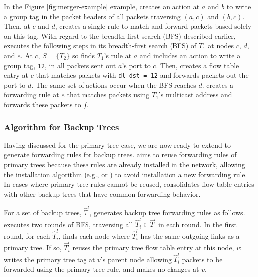 In the Figure \ref{fig:merger-example} example, \merge  creates an action at $a$ and $b$ to write a group tag in the packet headers of all packets traversing $(a,c)$ and $(b,c)$.
Then, at $c$ and $d$, \merge creates a single rule to match and forward packets based solely on this tag.  With regard to the breadth-first search (BFS) described earlier, 
\merge executes the following steps in  its breadth-first search (BFS) of $T_1$ at nodes $c$, $d$, and $e$.
At $c$, $S=\{T_2\}$ so \merge finds $T_1$'s rule at $a$ and includes an action to write a group tag, {\tt 12}, in all packets sent out $a$'s port to $c$. 
Then, \merge creates a flow table entry at $c$ that matches packets with {\tt dl\_dst = 12} and forwards packets out the port to $d$.  The same set of actions occur when the BFS reaches $d$. 
\merge creates a forwarding rule at $e$ that matches packets using $T_1$'s multicast address and forwards these packets to $f$.



\subsubsection{\mergen Algorithm for Backup Trees}
\label{subsubsec:merge-backup}

Having discussed \merge for the primary tree case, we are now ready to extend \merge to generate forwarding rules for backup trees.  \merge 
aims to reuse forwarding rules of primary trees because these rules are already installed in the network, allowing the installation algorithm
(e.g., \pre or \posts) to avoid installation a new forwarding rule.  In cases where primary tree rules cannot be reused, \merge consolidates
flow table entries with other backup trees that have common forwarding behavior.

For a set of backup trees, $\hat{T}^l$, \merge generates backup tree forwarding rules as follows. 
\merge executes two rounds of BFS, traversing all
$\hat{T}^l_i \in \hat{T}^l$ in each round.  In the first round, for each $\hat{T}_i^l$, \merge finds each node where $\hat{T}_i^l$ has the same outgoing links as a primary tree.  
If so, $\hat{T}_i^l$ reuses the primary tree flow table entry at this node, $v$: \merge writes the primary tree tag at $v$'s parent node
allowing $\hat{T}_i^l$ packets to be forwarded using the primary tree rule, and makes no changes at $v$.

